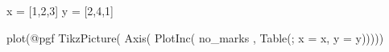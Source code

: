 \documentclass{article}
\begin{document}
\begin{jlblock}
	x = [1,2,3]
	y = [2,4,1]

	plot(@pgf TikzPicture(
            Axis(
                PlotInc({ no_marks },
                    Table(; x = x, y = y)))))
\end{jlblock}

\end{document}
